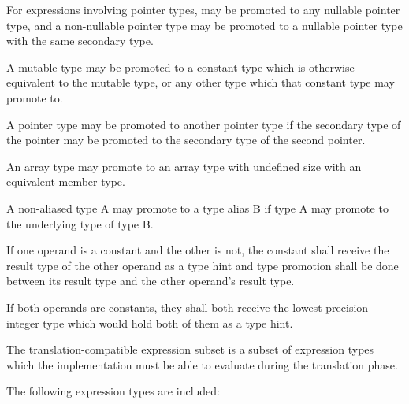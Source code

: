 \specsubitem
For expressions involving pointer types,  may be promoted to any
nullable pointer type, and a non-nullable pointer type may be promoted to
a nullable pointer type with the same secondary type.

\specsubitem
A mutable type may be promoted to a constant type which is otherwise equivalent
to the mutable type, or any other type which that constant type may promote to.

\specsubitem
A pointer type may be promoted to another pointer type if the secondary type of
the pointer may be promoted to the secondary type of the second pointer.

\specsubitem
An array type may promote to an array type with undefined size with an
equivalent member type.

\specsubitem
A non-aliased type A may promote to a type alias B if type A may promote to the
underlying type of type B.


\specsubitem
If one operand is a constant and the other is not, the constant shall receive
the result type of the other operand as a type hint and type promotion shall be
done between its result type and the other operand's result type.

\specsubitem
If both operands are constants, they shall both receive the lowest-precision
integer type which would hold both of them as a type hint.


The translation-compatible expression subset is a subset of expression types
which the implementation must be able to evaluate during the translation phase.

\specsubitem
The following expression types are included:

